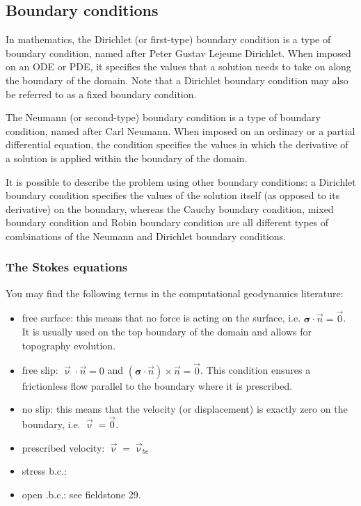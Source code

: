 \newpage
\subsection{Boundary conditions}

In mathematics, the Dirichlet (or first-type) 
boundary condition is a type of boundary condition, named after Peter Gustav Lejeune Dirichlet.
When imposed on an ODE or PDE, it specifies the values that a solution needs 
to take on along the boundary of the domain.
Note that a Dirichlet boundary condition may also be referred to as a fixed boundary condition. 

The Neumann (or second-type) boundary condition is a type of boundary condition, 
named after Carl Neumann. When imposed on an ordinary or a partial differential equation, 
the condition specifies the values in which the derivative of a solution is 
applied within the boundary of the domain.

It is possible to describe the problem using other boundary conditions: 
a Dirichlet boundary condition specifies the values of the solution itself 
(as opposed to its derivative) on the boundary, whereas the Cauchy boundary condition, mixed boundary condition and Robin boundary condition are all different types of combinations of the Neumann and Dirichlet boundary conditions.






\subsubsection{The Stokes equations}

You may find the following terms in the computational geodynamics literature:

\begin{itemize}
\item { free surface}: this means that no force is acting on the surface, i.e. ${\bm \sigma}\cdot {\vec n}={\vec 0}$. It is usually used on the top boundary of the domain and allows for topography evolution.
\item { free slip}: ${\vec \upnu}\cdot \vec n = 0$ and $({\bm \sigma}\cdot{\vec n})\times {\vec n}={\vec 0}$. This condition ensures a frictionless flow parallel to the boundary where it is prescribed.
\item { no slip}: this means that the velocity (or displacement) is exactly zero on the boundary, i.e. ${\vec \upnu}={\vec 0}$.
\item { prescribed velocity}: ${\vec \upnu}={\vec \upnu}_{bc}$
\item stress b.c.: 
\item open .b.c.: see fieldstone 29. 
\end{itemize}

